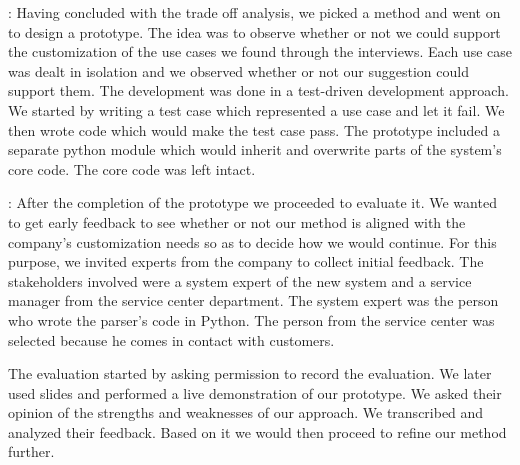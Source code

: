 

: 
Having concluded with the trade off analysis, we picked a method and went on to design a prototype. The idea was to observe whether or not we could support the customization of the use cases we found through the interviews. Each use case was dealt in isolation and we observed whether or not our suggestion could support them. 
The development was done in a test-driven development approach. We started by writing a test case which represented a use case and let it fail. We then wrote code which would make the test case pass. The prototype included a separate python module which would inherit and overwrite parts of the system's core code. The core code was left intact. 



: 
After the completion of the prototype we proceeded to evaluate it. We wanted to get early feedback to see whether or not our method is aligned with the company's customization needs so as to decide how we would continue.  For this purpose, we invited experts from the company to collect initial feedback. The stakeholders involved were a system expert of the new system and a service manager from the service center department. The system expert was the person who wrote the parser's code in Python. The person from the service center was selected because he comes in contact with customers. 

The evaluation started by asking permission to record the evaluation. We later used slides and performed a live demonstration of our prototype. We asked their opinion of the strengths and weaknesses of our approach. We transcribed and analyzed their feedback. Based on it we would then proceed to refine our method further. 

